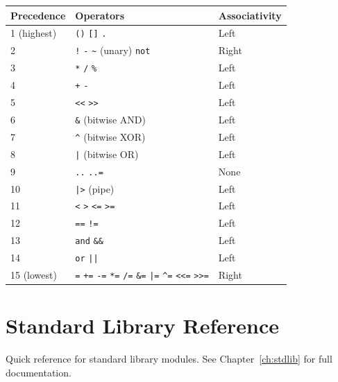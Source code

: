 \documentclass[11pt,a4paper]{book}
\newcommand{\code}[1]{\texttt{#1}}
\begin{document}
\begin{longtable}{lll}
\toprule
\textbf{Precedence} & \textbf{Operators} & \textbf{Associativity} \\
\midrule
\endhead
1 (highest) & \code{()} \code{[]} \code{.} & Left \\
2 & \code{!} \code{-} \code{\~{}} (unary) \code{not} & Right \\
3 & \code{*} \code{/} \code{\%} & Left \\
4 & \code{+} \code{-} & Left \\
5 & \code{<<} \code{>>} & Left \\
6 & \code{\&} (bitwise AND) & Left \\
7 & \code{\^{}} (bitwise XOR) & Left \\
8 & \code{|} (bitwise OR) & Left \\
9 & \code{..} \code{..=} & None \\
10 & \code{|>} (pipe) & Left \\
11 & \code{<} \code{>} \code{<=} \code{>=} & Left \\
12 & \code{==} \code{!=} & Left \\
13 & \code{and} \code{\&\&} & Left \\
14 & \code{or} \code{||} & Left \\
15 (lowest) & \code{=} \code{+=} \code{-=} \code{*=} \code{/=} \code{\&=} \code{|=} \code{\^{}=} \code{<<=} \code{>>=} & Right \\
\bottomrule
\end{longtable}

\chapter{Standard Library Reference}
\label{app:stdlib}

Quick reference for standard library modules. See Chapter~\ref{ch:stdlib} for full documentation.
\end{document}
